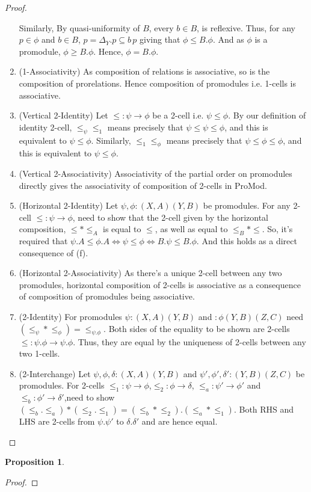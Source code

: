\documentclass[18pt,a4paper]{article}
\makeatletter
\theoremstyle{definition}
\newtheorem{proop}{Proposition}[section]
\newcommand{\carrow}{}%
\DeclareRobustCommand{\carrow}{%
	\mathrel{\vphantom{\rightarrow}\mathpalette\circle@arrow\relax}%
}
\newcommand{\circle@arrow}[2]{%
	\m@th
	\ooalign{%
		\hidewidth$#1\circ\mkern1mu$\hidewidth\cr
	$#1\longrightarrow$\cr}%
}
\makeatother
\begin{document}
\begin{proof}
\begin{enumerate}[label=(\alph*)]
				Similarly, By quasi-uniformity of $B$, every $b \in B$, is
				reflexive. Thus, for any $p \in \phi$ and $b\in B$, $p=\Delta_Y.p\subseteq
				b\,p$ giving that $\phi \leq B.\phi$. And as $\phi$ is a promodule,
				$\phi \geq B.\phi$. Hence, $\phi=B.\phi$.
			\item (1-Associativity) As composition of relations is associative, so is the
				composition of prorelations. Hence composition of promodules i.e. 1-cells
				is associative.
			\item (Vertical 2-Identity) Let $\leq:\psi \to \phi$ be a 2-cell i.e.
				$\psi \leq \phi$. By our definition of identity 2-cell, $\leq_\psi \leq_1$
				means precisely that $\psi \leq \psi \leq \phi $, and this is equivalent to
				$\psi \leq \phi$. Similarly, $\leq_1 \leq_\phi$ means precisely that $\psi
				\leq \phi \leq \phi $, and this is equivalent to $\psi \leq \phi$.
			\item (Vertical 2-Associativity) Associativity of the partial order on promodules
				directly gives the associativity of composition of 2-cells in ProMod.
			\item (Horizontal 2-Identity) Let $\psi,\phi: (X,A)\carrow (Y,B)$ be promodules.
				For any 2-cell $\leq:\psi \to \phi $, need to show that the 2-cell given
				by the horizontal composition, $\leq*\leq_A$ is equal to $\leq$, as well as
				equal to $\leq_B *\leq$. So, it's required that $\psi.A \leq \phi.A
				\iff \psi \leq \phi \iff B.\psi \leq B.\phi$. And this holds as a
				direct consequence of (f).
			\item (Horizontal 2-Associativity) As there's a unique 2-cell between any two
				promodules, horizontal composition of 2-cells is associative as
				a consequence of composition of promodules being associative.
			\item (2-Identity) For promodules $\psi:(X,A)\carrow (Y,B)$ and
				$:\phi(Y,B) \carrow (Z,C)$ need $(\leq_\psi * \leq_\phi)=\leq_{\psi.\phi}$.
				Both sides of the equality to be shown are 2-cells $\leq:\psi.\phi
				\to \psi.\phi$.	Thus, they are equal by the uniqueness of 2-cells between
				any two 1-cells.
			\item (2-Interchange) Let $\psi,\phi,\delta:(X,A) \carrow (Y,B)$ and
				$\psi',\phi',\delta':(Y,B) \carrow (Z,C)$ be promodules. For
				2-cells $\leq_1:\psi \to \phi $,$\leq_2:\phi \to \delta $,
				$\leq_a:\psi' \to \phi' $ and $\leq_b:\phi' \to \delta'$,need to show
				$(\leq_b.\leq_a)*(\leq_2.\leq_1)=(\leq_b*\leq_2).(\leq_a*\leq_1)$.
				Both RHS and LHS are 2-cells from $\psi.\psi'$ to $\delta.\delta'$ and are
				hence equal.
		\end{enumerate}
	\end{proof}
	\begin{proop}

	\end{proop}
	\begin{proof}

	\end{proof}
\end{document}
